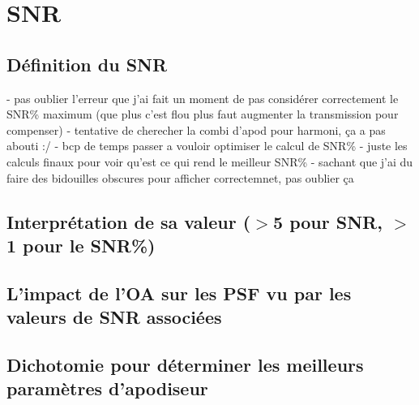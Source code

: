 \section{SNR}
\subsection{Définition du SNR}

- pas oublier l’erreur que j’ai fait un moment de pas considérer correctement le SNR\% maximum (que plus c’est flou plus faut augmenter la transmission pour compenser)
- tentative de cherecher la combi d’apod pour harmoni, ça a pas abouti :/
- bcp de temps passer a vouloir optimiser le calcul de SNR\%
- juste les calculs finaux pour voir qu’est ce qui rend le meilleur SNR\%
    - sachant que j’ai du faire des bidouilles obscures pour afficher correctemnet, pas oublier ça

\subsection{Interprétation de sa valeur ($>$5 pour SNR, $>$1 pour le SNR\%)}

\subsection{L’impact de l’OA sur les PSF vu par les valeurs de SNR associées}

\subsection{Dichotomie pour déterminer les meilleurs paramètres d’apodiseur}